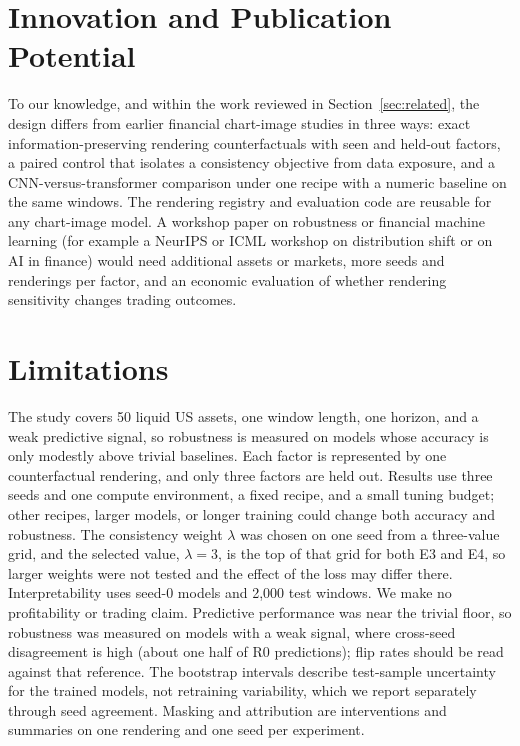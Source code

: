 \documentclass[10pt,journal,compsoc]{IEEEtran}
\begin{document}
\section{Innovation and Publication Potential}\label{sec:innovation}
To our knowledge, and within the work reviewed in Section~\ref{sec:related}, the design differs from earlier financial chart-image studies in three ways: exact information-preserving rendering counterfactuals with seen and held-out factors, a paired control that isolates a consistency objective from data exposure, and a CNN-versus-transformer comparison under one recipe with a numeric baseline on the same windows. The rendering registry and evaluation code are reusable for any chart-image model. A workshop paper on robustness or financial machine learning (for example a NeurIPS or ICML workshop on distribution shift or on AI in finance) would need additional assets or markets, more seeds and renderings per factor, and an economic evaluation of whether rendering sensitivity changes trading outcomes.

\section{Limitations}\label{sec:limits}
The study covers 50 liquid US assets, one window length, one horizon, and a weak predictive signal, so robustness is measured on models whose accuracy is only modestly above trivial baselines. Each factor is represented by one counterfactual rendering, and only three factors are held out. Results use three seeds and one compute environment, a fixed recipe, and a small tuning budget; other recipes, larger models, or longer training could change both accuracy and robustness. The consistency weight $\lambda$ was chosen on one seed from a three-value grid, and the selected value, $\lambda = 3$, is the top of that grid for both E3 and E4, so larger weights were not tested and the effect of the loss may differ there. Interpretability uses seed-0 models and 2{,}000 test windows. We make no profitability or trading claim.
Predictive performance was near the trivial floor, so robustness was measured on models with a weak signal, where cross-seed disagreement is high (about one half of R0 predictions); flip rates should be read against that reference. The bootstrap intervals describe test-sample uncertainty for the trained models, not retraining variability, which we report separately through seed agreement. Masking and attribution are interventions and summaries on one rendering and one seed per experiment.
\end{document}
